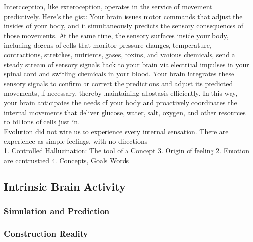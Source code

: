 Interoception, like exteroception, operates in the service of movement predictively. Here’s the gist: Your brain issues motor commands that adjust the insides of your body, and it simultaneously predicts the sensory consequences of those movements. At the same time, the sensory surfaces inside your body, including dozens of cells that monitor pressure changes, temperature, contractions, stretches, nutrients, gases, toxins, and various chemicals, send a steady stream of sensory signals back to your brain via electrical impulses in your spinal cord and swirling chemicals in your blood. Your brain integrates these sensory signals to confirm or correct the predictions and adjust its predicted movements, if necessary, thereby maintaining allostasis efficiently. In this way, your brain anticipates the needs of your body and proactively coordinates the internal movements that deliver glucose, water, salt, oxygen, and other resources to billions of cells just in.\\


Evolution did not wire us to experience every internal sensation. There are experience as simple feelings, with no directions.\\


1. Controlled Hallucination: The tool of a  Concept
3. Origin of feeling
2. Emotion are contrustred
4. Concepts, Goals Words


\subsection{Intrinsic Brain Activity}
\subsubsection{Simulation and Prediction}
\subsubsection{Construction Reality}

